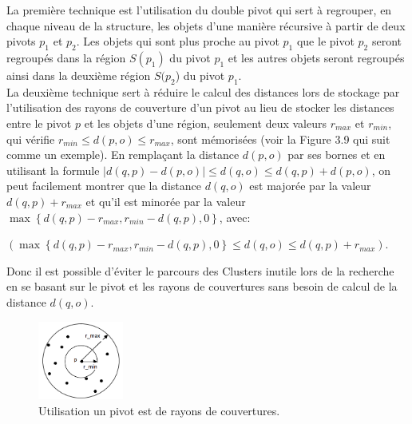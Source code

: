 La première technique est l’utilisation du double pivot qui sert à regrouper, en chaque niveau de la structure, les objets d’une manière récursive à partir de deux pivots $ p_1 $ et $ p_2 $. Les objets qui sont plus proche au pivot $ p_1 $ que le pivot $ p_2 $ seront regroupés dans la région $ S(p_1) $ du pivot $ p_1 $ et les autres objets seront regroupés ainsi dans la deuxième région $ S(p_2 $) du pivot $ p_1 $.\\

La deuxième technique sert à réduire le calcul des distances lors de stockage par l’utilisation des rayons de couverture d’un pivot au lieu de stocker les distances entre le pivot $ p $ et les objets d'une région, seulement deux valeurs $ r_{max} $ et $ r_{min} $, qui vérifie $  r_{min}  \le d(p,o) \le r_{max}  $, sont mémorisées (voir la Figure 3.9 qui suit comme un exemple). En remplaçant la distance $ d(p,o) $ par ses bornes et en utilisant la formule $ |d(q,p)-d(p,o)| \le d(q,o) \le d(q,p)+d(p,o) $, on peut facilement montrer que la distance $ d(q,o) $ est majorée par la valeur $ d(q,p) + r_{max} $ et qu’il est minorée par la valeur
$ \max \left\{d(q,p) - r_{max}, r_{min} - d(q,p), 0\right\} $,
avec:
\begin{center}
	$  ( \max \left\{ d(q,p) - r_{max} , r_{min} - d(q,p), 0\right\} \le d(q,o) \le d(q,p) + r_{max} ) $.
\end{center}
 Donc il est possible d’éviter le parcours des Clusters inutile lors de la recherche en se basant sur le pivot et les rayons de couvertures sans besoin de calcul de la distance $ d(q,o) $.
\begin{figure}[H]
	\centering
	\includegraphics[width=0.25\textwidth]{Figures/radius.png} %
	\caption{Utilisation un pivot est de rayons de couvertures.}
\end{figure}

